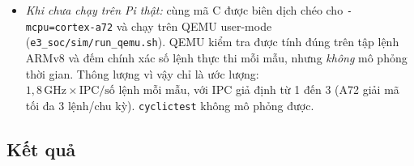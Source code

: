 \documentclass[11pt,a4paper]{article}
\begin{document}
\begin{itemize}
\begin{itemize}
  \item \emph{Khi chưa chạy trên Pi thật:} cùng mã C được biên dịch chéo cho \texttt{-mcpu=cortex-a72} và chạy trên QEMU user-mode (\texttt{e3\_soc/sim/run\_qemu.sh}). QEMU kiểm tra được tính đúng trên tập lệnh ARMv8 và đếm chính xác số lệnh thực thi mỗi mẫu, nhưng \emph{không} mô phỏng thời gian. Thông lượng vì vậy chỉ là ước lượng: $1{,}8\,\text{GHz} \times \text{IPC} / \text{số lệnh mỗi mẫu}$, với IPC giả định từ 1 đến 3 (A72 giải mã tối đa 3 lệnh/chu kỳ). \texttt{cyclictest} không mô phỏng được.
  \end{itemize}
\end{itemize}

\subsection{Kết quả}
\end{document}
